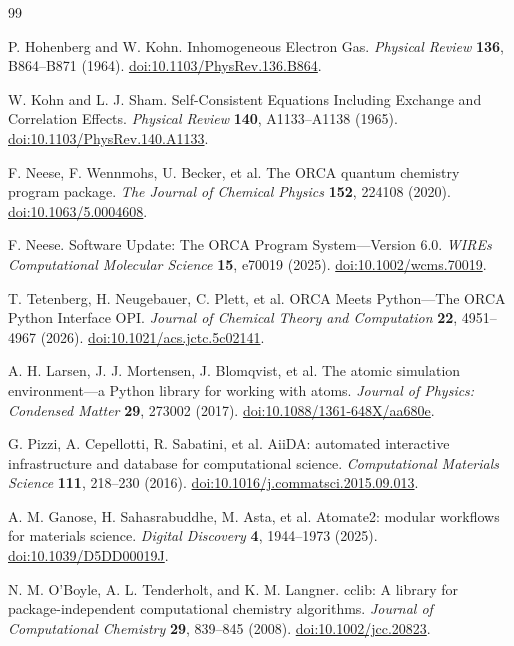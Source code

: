 \documentclass[a4paper,11pt]{article}
\begin{document}
\begin{thebibliography}{99}
  \setlength{\itemsep}{0.25em}

  P. Hohenberg and W. Kohn.
  Inhomogeneous Electron Gas.
  \emph{Physical Review} \textbf{136}, B864--B871 (1964).
  \href{https://doi.org/10.1103/PhysRev.136.B864}{doi:10.1103/PhysRev.136.B864}.

  W. Kohn and L. J. Sham.
  Self-Consistent Equations Including Exchange and Correlation Effects.
  \emph{Physical Review} \textbf{140}, A1133--A1138 (1965).
  \href{https://doi.org/10.1103/PhysRev.140.A1133}{doi:10.1103/PhysRev.140.A1133}.

  F. Neese, F. Wennmohs, U. Becker, et al.
  The ORCA quantum chemistry program package.
  \emph{The Journal of Chemical Physics} \textbf{152}, 224108 (2020).
  \href{https://doi.org/10.1063/5.0004608}{doi:10.1063/5.0004608}.

  F. Neese.
  Software Update: The ORCA Program System---Version 6.0.
  \emph{WIREs Computational Molecular Science} \textbf{15}, e70019 (2025).
  \href{https://doi.org/10.1002/wcms.70019}{doi:10.1002/wcms.70019}.

  T. Tetenberg, H. Neugebauer, C. Plett, et al.
  ORCA Meets Python---The ORCA Python Interface OPI.
  \emph{Journal of Chemical Theory and Computation} \textbf{22}, 4951--4967 (2026).
  \href{https://doi.org/10.1021/acs.jctc.5c02141}{doi:10.1021/acs.jctc.5c02141}.

  A. H. Larsen, J. J. Mortensen, J. Blomqvist, et al.
  The atomic simulation environment---a Python library for working with atoms.
  \emph{Journal of Physics: Condensed Matter} \textbf{29}, 273002 (2017).
  \href{https://doi.org/10.1088/1361-648X/aa680e}{doi:10.1088/1361-648X/aa680e}.

  G. Pizzi, A. Cepellotti, R. Sabatini, et al.
  AiiDA: automated interactive infrastructure and database for computational science.
  \emph{Computational Materials Science} \textbf{111}, 218--230 (2016).
  \href{https://doi.org/10.1016/j.commatsci.2015.09.013}{doi:10.1016/j.commatsci.2015.09.013}.

  A. M. Ganose, H. Sahasrabuddhe, M. Asta, et al.
  Atomate2: modular workflows for materials science.
  \emph{Digital Discovery} \textbf{4}, 1944--1973 (2025).
  \href{https://doi.org/10.1039/D5DD00019J}{doi:10.1039/D5DD00019J}.

  N. M. O'Boyle, A. L. Tenderholt, and K. M. Langner.
  cclib: A library for package-independent computational chemistry algorithms.
  \emph{Journal of Computational Chemistry} \textbf{29}, 839--845 (2008).
  \href{https://doi.org/10.1002/jcc.20823}{doi:10.1002/jcc.20823}.


\end{thebibliography}
\end{document}
